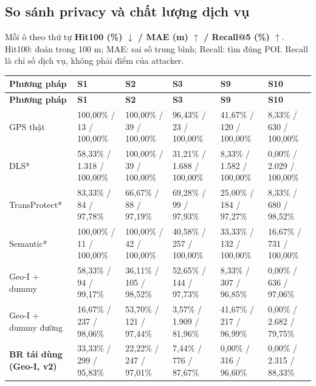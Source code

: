 \subsection{So sánh privacy và chất lượng dịch vụ}
Mỗi ô theo thứ tự \textbf{Hit100 (\%) $\downarrow$ / MAE (m) $\uparrow$ / Recall@5 (\%) $\uparrow$}. Hit100: đoán trong 100 m; MAE: sai số trung bình; Recall: tìm đúng POI. Recall là chỉ số dịch vụ, không phải điểm của attacker.

\begingroup\small
\begin{longtable}{@{}P{2.804cm}P{2.598cm}P{2.598cm}P{2.598cm}P{2.598cm}P{2.598cm}@{}}
\toprule
\textbf{Phương pháp} & \textbf{S1} & \textbf{S2} & \textbf{S3} & \textbf{S9} & \textbf{S10}\\\midrule
\endfirsthead
\toprule
\textbf{Phương pháp} & \textbf{S1} & \textbf{S2} & \textbf{S3} & \textbf{S9} & \textbf{S10}\\\midrule
\endhead
\bottomrule\endfoot
GPS thật & 100,00\% / 13 / 100,00\% & 100,00\% / 39 / 100,00\% & 96,43\% / 23 / 100,00\% & 41,67\% / 120 / 100,00\% & 8,33\% / 630 / 100,00\%\\
\addlinespace[3pt]
DLS* & 58,33\% / 1.318 / 100,00\% & 100,00\% / 39 / 100,00\% & 31,21\% / 1.688 / 100,00\% & 8,33\% / 1.582 / 100,00\% & 0,00\% / 2.029 / 100,00\%\\
\addlinespace[3pt]
TransProtect* & 83,33\% / 84 / 97,78\% & 66,67\% / 88 / 97,19\% & 69,28\% / 99 / 97,93\% & 25,00\% / 184 / 97,27\% & 8,33\% / 680 / 98,52\%\\
\addlinespace[3pt]
Semantic* & 100,00\% / 11 / 100,00\% & 100,00\% / 42 / 100,00\% & 40,58\% / 257 / 100,00\% & 33,33\% / 132 / 100,00\% & 16,67\% / 731 / 100,00\%\\
\addlinespace[3pt]
Geo-I + dummy & 58,33\% / 94 / 99,17\% & 36,11\% / 105 / 98,52\% & 52,65\% / 144 / 97,73\% & 8,33\% / 307 / 96,85\% & 0,00\% / 636 / 97,06\%\\
\addlinespace[3pt]
Geo-I + dummy đường & 16,67\% / 237 / 98,06\% & 53,70\% / 121 / 97,44\% & 3,57\% / 1.909 / 81,96\% & 41,67\% / 217 / 96,99\% & 0,00\% / 2.682 / 79,75\%\\
\addlinespace[3pt]
\textbf{BR tái dùng (Geo-I, v2)} & 33,33\% / 299 / 95,83\% & 22,22\% / 247 / 97,01\% & 7,44\% / 776 / 87,67\% & 0,00\% / 316 / 96,60\% & 0,00\% / 2.315 / 88,33\%\\
\end{longtable}
\endgroup
{}

